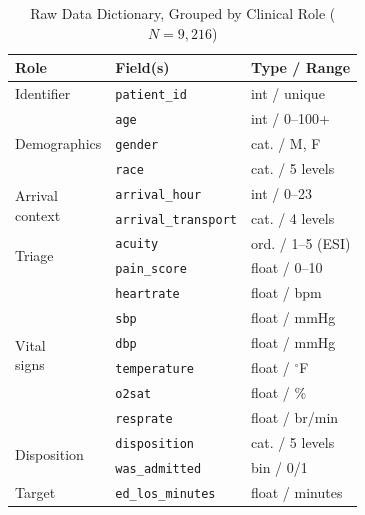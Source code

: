 \documentclass[conference]{IEEEtran}
\begin{document}
\begin{table}[H]
\centering
\caption{Raw Data Dictionary, Grouped by Clinical Role ($N=9{,}216$)}
\label{tab:dictionary}
\renewcommand{\arraystretch}{1.15}
\begin{tabular}{p{1.9cm}p{3.0cm}p{2.5cm}}
\toprule
\textbf{Role} & \textbf{Field(s)} & \textbf{Type / Range} \\
\midrule
Identifier
 & \texttt{patient\_id} & int / unique \\
\midrule
\multirow{3}{*}{\parbox{1.9cm}{Demographics}}
 & \texttt{age}    & int / 0--100+ \\
 & \texttt{gender} & cat. / M, F \\
 & \texttt{race}   & cat. / 5 levels \\
\midrule
\multirow{2}{*}{\parbox{1.9cm}{Arrival\\context}}
 & \texttt{arrival\_hour}      & int / 0--23 \\
 & \texttt{arrival\_transport} & cat. / 4 levels \\
\midrule
\multirow{2}{*}{Triage}
 & \texttt{acuity}      & ord. / 1--5 (ESI) \\
 & \texttt{pain\_score} & float / 0--10 \\
\midrule
\multirow{6}{*}{\parbox{1.9cm}{Vital\\signs}}
 & \texttt{heartrate}   & float / bpm \\
 & \texttt{sbp}         & float / mmHg \\
 & \texttt{dbp}         & float / mmHg \\
 & \texttt{temperature} & float / $^\circ$F \\
 & \texttt{o2sat}       & float / \% \\
 & \texttt{resprate}    & float / br/min \\
\midrule
\multirow{2}{*}{Disposition}
 & \texttt{disposition}   & cat. / 5 levels \\
 & \texttt{was\_admitted} & bin / 0/1 \\
\midrule
Target
 & \texttt{ed\_los\_minutes} & float / minutes \\
\bottomrule
\end{tabular}
\end{table}
\end{document}
